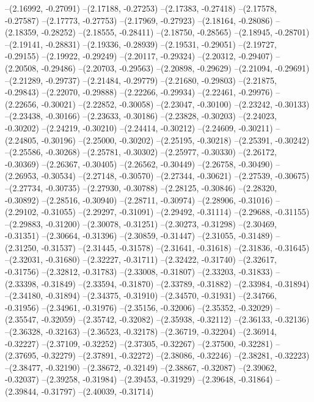 --(2.16992, -0.27091)
--(2.17188, -0.27253)
--(2.17383, -0.27418)
--(2.17578, -0.27587)
--(2.17773, -0.27753)
--(2.17969, -0.27923)
--(2.18164, -0.28086)
--(2.18359, -0.28252)
--(2.18555, -0.28411)
--(2.18750, -0.28565)
--(2.18945, -0.28701)
--(2.19141, -0.28831)
--(2.19336, -0.28939)
--(2.19531, -0.29051)
--(2.19727, -0.29155)
--(2.19922, -0.29249)
--(2.20117, -0.29324)
--(2.20312, -0.29407)
--(2.20508, -0.29486)
--(2.20703, -0.29563)
--(2.20898, -0.29629)
--(2.21094, -0.29691)
--(2.21289, -0.29737)
--(2.21484, -0.29779)
--(2.21680, -0.29803)
--(2.21875, -0.29843)
--(2.22070, -0.29888)
--(2.22266, -0.29934)
--(2.22461, -0.29976)
--(2.22656, -0.30021)
--(2.22852, -0.30058)
--(2.23047, -0.30100)
--(2.23242, -0.30133)
--(2.23438, -0.30166)
--(2.23633, -0.30186)
--(2.23828, -0.30203)
--(2.24023, -0.30202)
--(2.24219, -0.30210)
--(2.24414, -0.30212)
--(2.24609, -0.30211)
--(2.24805, -0.30196)
--(2.25000, -0.30202)
--(2.25195, -0.30218)
--(2.25391, -0.30242)
--(2.25586, -0.30268)
--(2.25781, -0.30302)
--(2.25977, -0.30330)
--(2.26172, -0.30369)
--(2.26367, -0.30405)
--(2.26562, -0.30449)
--(2.26758, -0.30490)
--(2.26953, -0.30534)
--(2.27148, -0.30570)
--(2.27344, -0.30621)
--(2.27539, -0.30675)
--(2.27734, -0.30735)
--(2.27930, -0.30788)
--(2.28125, -0.30846)
--(2.28320, -0.30892)
--(2.28516, -0.30940)
--(2.28711, -0.30974)
--(2.28906, -0.31016)
--(2.29102, -0.31055)
--(2.29297, -0.31091)
--(2.29492, -0.31114)
--(2.29688, -0.31155)
--(2.29883, -0.31200)
--(2.30078, -0.31251)
--(2.30273, -0.31298)
--(2.30469, -0.31351)
--(2.30664, -0.31396)
--(2.30859, -0.31447)
--(2.31055, -0.31489)
--(2.31250, -0.31537)
--(2.31445, -0.31578)
--(2.31641, -0.31618)
--(2.31836, -0.31645)
--(2.32031, -0.31680)
--(2.32227, -0.31711)
--(2.32422, -0.31740)
--(2.32617, -0.31756)
--(2.32812, -0.31783)
--(2.33008, -0.31807)
--(2.33203, -0.31833)
--(2.33398, -0.31849)
--(2.33594, -0.31870)
--(2.33789, -0.31882)
--(2.33984, -0.31894)
--(2.34180, -0.31894)
--(2.34375, -0.31910)
--(2.34570, -0.31931)
--(2.34766, -0.31956)
--(2.34961, -0.31976)
--(2.35156, -0.32006)
--(2.35352, -0.32029)
--(2.35547, -0.32059)
--(2.35742, -0.32082)
--(2.35938, -0.32112)
--(2.36133, -0.32136)
--(2.36328, -0.32163)
--(2.36523, -0.32178)
--(2.36719, -0.32204)
--(2.36914, -0.32227)
--(2.37109, -0.32252)
--(2.37305, -0.32267)
--(2.37500, -0.32281)
--(2.37695, -0.32279)
--(2.37891, -0.32272)
--(2.38086, -0.32246)
--(2.38281, -0.32223)
--(2.38477, -0.32190)
--(2.38672, -0.32149)
--(2.38867, -0.32087)
--(2.39062, -0.32037)
--(2.39258, -0.31984)
--(2.39453, -0.31929)
--(2.39648, -0.31864)
--(2.39844, -0.31797)
--(2.40039, -0.31714)
